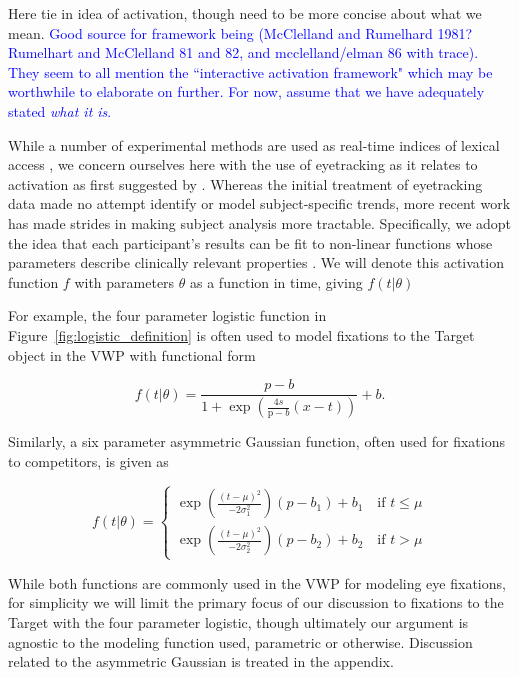 \documentclass{article}
\providecommand{\cn}[1]{\textcolor{blue}{#1}}
\begin{document}
Here tie in idea of activation, though need to be more concise about what we mean. \cn{Good source for framework being (McClelland and Rumelhard 1981? Rumelhart and McClelland 81 and 82, and mcclelland/elman 86 with trace). They seem to all mention the ``interactive activation framework" which may be worthwhile to elaborate on further. For now, assume that we have adequately stated \textit{what it is}.}

While a number of experimental methods are used as real-time indices of lexical access \citep{Spivey2005}, we concern ourselves here with the use of eyetracking as it relates to activation as first suggested by \cite{allopenna1998tracking}. Whereas the initial treatment of eyetracking data made no attempt identify or model subject-specific trends, more recent work has made strides in making subject analysis more tractable. Specifically, we adopt the idea that each participant's results can be fit to non-linear functions whose parameters describe clinically relevant properties \cite{mcmurray2010individual}. We will denote this activation function $f$ with parameters $\theta$ as a function in time, giving $f(t|\theta)$

For example, the four parameter logistic function in Figure~\ref{fig:logistic_definition} is often used to model fixations to the Target object in the VWP with functional form

\begin{equation} \label{eq:logistic}
f(t|\theta) = \frac{p-b}{1 + \exp \left(\frac{4s}{\text{p}-b} (x - t) \right)} + b.
\end{equation}

Similarly, a six parameter asymmetric Gaussian function, often used for fixations to competitors, is given as

\begin{equation} \label{eq:dg}
f(t|\theta) = \begin{cases}
\exp \left( \frac{(t - \mu)^2}{-2\sigma_1^2} \right) (p - b_1) + b_1 \quad \text{if } t \leq \mu \\
\exp \left( \frac{(t - \mu)^2}{-2\sigma_2^2} \right) (p - b_2) + b_2 \quad \text{if } t > \mu
\end{cases}
\end{equation}



While both functions are commonly used in the VWP for modeling eye fixations, for simplicity we will limit the primary focus of our discussion to fixations to the Target with the four parameter logistic, though ultimately our argument is agnostic to the modeling function used, parametric or otherwise. Discussion related to the asymmetric Gaussian is treated in the appendix.
\end{document}
